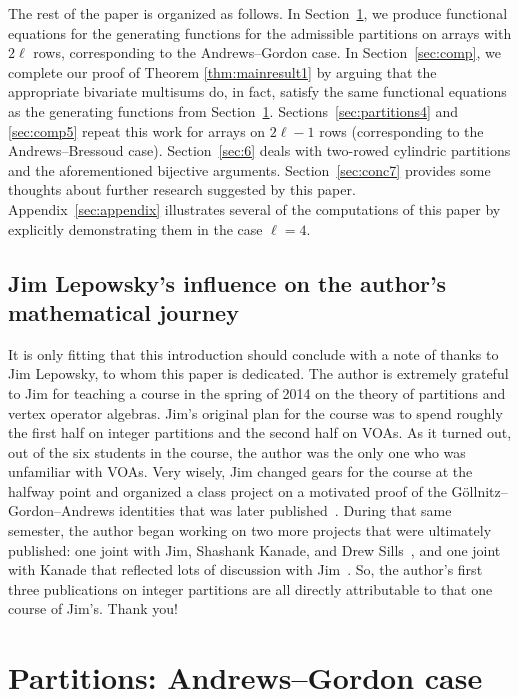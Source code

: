 \documentclass[10pt,a4paper]{amsart}
\numberwithin{equation}{section}
\theoremstyle{definition}
\begin{document}
The rest of the paper is organized as follows. In Section~\ref{sec:partitions2}, we produce functional equations for the generating functions for the admissible partitions on arrays with $2\ell$ rows, corresponding to the Andrews--Gordon case. In Section~\ref{sec:comp}, we complete our proof of Theorem \ref{thm:mainresult1} by arguing that the appropriate bivariate multisums do, in fact, satisfy the same functional equations as the generating functions from Section~\ref{sec:partitions2}. Sections~\ref{sec:partitions4} and \ref{sec:comp5} repeat this work for arrays on $2\ell-1$ rows (corresponding to the Andrews--Bressoud case). Section~\ref{sec:6} deals with two-rowed cylindric partitions and the aforementioned bijective arguments. Section~\ref{sec:conc7} provides some thoughts about further research suggested by this paper. Appendix~\ref{sec:appendix} illustrates several of the computations of this paper by explicitly demonstrating them in the case $\ell=4$.

\subsection{Jim Lepowsky's influence on the author's mathematical journey}

It is only fitting that this introduction should conclude with a note of thanks to Jim Lepowsky, to whom this paper is dedicated. The author is extremely grateful to Jim for teaching a course in the spring of 2014 on the theory of partitions and vertex operator algebras. Jim's original plan for the course was to spend roughly the first half on integer partitions and the second half on VOAs. As it turned out, out of the six students in the course, the author was the only one who was unfamiliar with VOAs. Very wisely, Jim changed gears for the course at the halfway point and organized a class project on a motivated proof of the G\"ollnitz--Gordon--Andrews identities that was later published~\cite{CKLMQRS}. During that same semester, the author began working on two more projects that were ultimately published: one joint with Jim, Shashank Kanade, and Drew Sills~\cite{KLRS}, and one joint with Kanade that reflected lots of discussion with Jim~\cite{KanRus-idf}. So, the author's first three publications on integer partitions are all directly attributable to that one course of Jim's. Thank you!


\section{Partitions: Andrews--Gordon case}\label{sec:partitions2}
\end{document}

